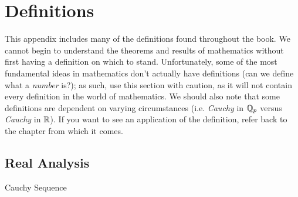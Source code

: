 \chapter{Definitions}

This appendix includes many of the definitions found throughout the book. We cannot begin to understand the theorems and results of mathematics without first having a definition on which to stand. Unfortunately, some of the most fundamental ideas in mathematics don't actually have definitions (can we define what a \textit{number} is?); as such, use this section with caution, as it will not contain every definition in the world of mathematics. We should also note that some definitions are dependent on varying circumstances (i.e. \textit{Cauchy} in $\mathbb{Q}_{p}$ versus \textit{Cauchy} in $\mathbb{R}$). If you want to see an application of the definition, refer back to the chapter from which it comes.

\section{Real Analysis}
\begin{udefinition}{Cauchy Sequence}
    
\end{udefinition}
